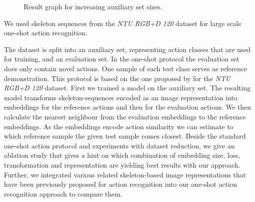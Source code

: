 \begin{figure}
    \centering
%
     \caption{Result graph for increasing auxiliary set sizes.}
    \label{fig:auxiliary_set_size_graph}
\end{figure}

We used skeleton sequences from the \textit{NTU RGB+D 120} \cite{liu2019ntu} dataset for large scale one-shot action recognition.

The dataset is split into an auxiliary set, representing action classes that are used for training, and an evaluation set.  In the one-shot protocol the evaluation set does only contain novel actions. One sample of each test class serves as reference demonstration. This protocol is based on the one proposed by \cite{liu2019ntu} for the \textit{NTU RGB+D 120} dataset. 
First we trained a model on the auxiliary set. The resulting model transforms skeleton-sequences encoded as an image representation into embeddings for the reference actions and then for the evaluation actions. We then calculate the nearest neighbour from the evaluation embeddings to the reference embeddings. 
As the embeddings encode action similarity we can estimate to which reference sample the given test sample comes closest.
Beside the standard one-shot action protocol and experiments with dataset reduction, we give an ablation study that gives a hint on which combination of embedding size, loss, transformation and representation are yielding best results with our approach.
Further, we integrated various related skeleton-based image representations that have been previously proposed for action recognition into our one-shot action recognition approach to compare them. 

